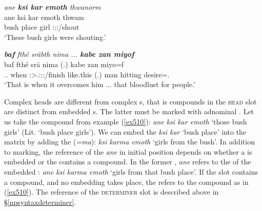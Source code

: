 \begin{exe}
 	\ex \emph{ane \textbf{ksi kar emoth} thwanorm}\\
 	\gll ane ksi kar emoth thwam\\
 	\Dem{} bush place girl \Stpl:\Sbj:\Pst:\Dur/shout\\
 	\trans `These bush girls were shouting.'
 	\label{ex510}
\end{exe}
\begin{exe}
 	\ex \emph{\textbf{baf} fthé sräbth nima ... \textbf{kabe zan miyof}}\\
 	\gll baf fthé srä nima (.) kabe zan miyo=f\\
 	\Recog.\Erg.\Sg{} when \Stsg:\Sbj>\Tsg.\Masc:\Obj:\Irr:\Pfv/finish like.this (.) man hitting desire=\Erg.\Sg\\
 	\trans `That is when it overcomes him ... that bloodlust for people.'\\
 	\label{ex511}
\end{exe}

Complex heads are different from complex s, that is compounds in the \textsc{head} slot are distinct from embedded s. The latter must be marked with adnominal . Let us take the compound from example (\ref{ex510}): \emph{ane ksi kar emoth} `those bush girls' (Lit. `bush place girls'). We can embed the  \emph{ksi kar} `bush place' into the matrix  by adding the   (\emph{=ma}): \emph{ksi karma emoth} `girls from the bush'. In addition to  marking, the reference of the  \emph{ane} in initial position depends on whether a  is embedded or the  contains a compound. In the former , \emph{ane} refers to the  of the embedded : \emph{ane ksi karma emoth} `girls from that bush place'. If the  slot contains a compound, and no embedding takes place, the  refers to the compound as in (\ref{ex510}). The reference of the \textsc{determiner} slot is described above in \S{}\ref{npsyntaxdeterminer}.\\

